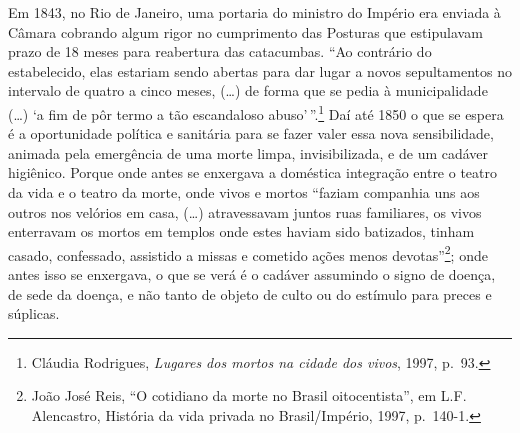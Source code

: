 Em 1843, no Rio de Janeiro, uma portaria do ministro do Império era
enviada à Câmara cobrando algum rigor no cumprimento das Posturas que
estipulavam prazo de 18 meses para reabertura das catacumbas. ``Ao
contrário do estabelecido, elas estariam sendo abertas para dar lugar a
novos sepultamentos no intervalo de quatro a cinco meses, (\ldots{}) de
forma que se pedia à municipalidade (\ldots{}) `a fim de pôr termo a tão
escandaloso abuso'\,''.\footnote{Cláudia Rodrigues, \textit{Lugares dos
  mortos na cidade dos vivos}, 1997, p.~93.} Daí até 1850 o que se
espera é a oportunidade política e sanitária para se fazer valer essa
nova sensibilidade, animada pela emergência de uma morte limpa,
invisibilizada, e de um cadáver higiênico. Porque onde antes se
enxergava a doméstica integração entre o teatro da vida e o teatro da
morte, onde vivos e mortos ``faziam companhia uns aos outros nos
velórios em casa, (\ldots{}) atravessavam juntos ruas familiares, os
vivos enterravam os mortos em templos onde estes haviam sido batizados,
tinham casado, confessado, assistido a missas e cometido ações menos
devotas''\footnote{João José Reis, ``O cotidiano da morte no Brasil
  oitocentista'', em L.F. Alencastro, História da vida privada no
  Brasil/Império, 1997, p.~140-1.}; onde antes isso se enxergava, o que
se verá é o cadáver assumindo o signo de doença, de sede da doença, e
não tanto de objeto de culto ou do estímulo para preces e súplicas.

